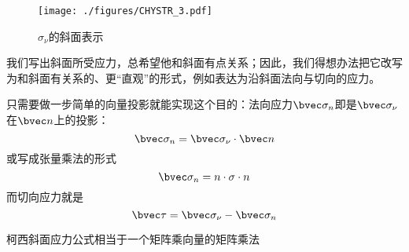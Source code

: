 \begin{figure}[ht]
\centering
\texttt{[image: ./figures/CHYSTR\_3.pdf]}
\caption{$\sigma_\nu$的斜面表示} \label{CHYSTR_fig3}
\end{figure}

我们写出斜面所受应力，总希望他和斜面有点关系；因此，我们得想办法把它改写为和斜面有关系的、更“直观”的形式，例如表达为沿斜面法向与切向的应力。

只需要做一步简单的向量投影就能实现这个目的：法向应力$\bvec \sigma_n$即是$\bvec \sigma_\nu$在$\bvec n$上的投影：
\begin{equation}
\bvec \sigma_n = \bvec \sigma_\nu \cdot \bvec n 
\end{equation}
或写成张量乘法的形式
\begin{equation}
\bvec \sigma_n = n \cdot \sigma \cdot n
\end{equation}
而切向应力就是
\begin{equation}
\bvec \tau = \bvec \sigma_\nu - \bvec \sigma_n
\end{equation}

柯西斜面应力公式相当于一个矩阵乘向量的矩阵乘法

